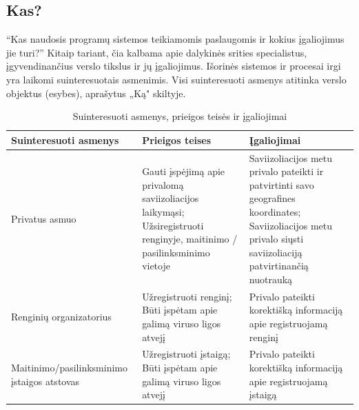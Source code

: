 \documentclass{VUMIFPSkursinis}
\begin{document}
\subsection{Kas?}
“Kas naudosis programų sistemos
teikiamomis paslaugomis ir kokius įgaliojimus jie turi?” Kitaip tariant, čia kalbama apie
dalykinės srities specialistus, įgyvendinančius verslo tikslus ir jų įgaliojimus. Išorinės sistemos ir procesai irgi yra laikomi suinteresuotais asmenimis. Visi suinteresuoti asmenys atitinka verslo objektus (esybes), aprašytus „Ką" skiltyje.
\begin{center}
	\small
	\begin{longtable}{|L{3cm}|C{5cm}|C{7cm}|}
		\caption{Suinteresuoti asmenys, prieigos teisės ir įgaliojimai}
		\label{table:EmployeeSalary}
		\\ \hline
		Suinteresuoti asmenys                                                                                                   &
		Prieigos teises                                                                                                         &
		Įgaliojimai                                                                                                                                                    \\ \hline
		Privatus asmuo                                                                                                          &
		Gauti įspėjimą apie privalomą saviizoliacijos laikymąsi; Užsiregistruoti renginyje, maitinimo / pasilinksminimo vietoje &
		Saviizoliacijos metu privalo pateikti ir patvirtinti savo geografines koordinates; Saviizoliacijos metu privalo siųsti saviizoliaciją patvirtinančią nuotrauką \\ \hline
		Renginių organizatorius                                                                                                 &
		Užregistruoti renginį; Būti įspėtam apie galimą viruso ligos atvejį                                                     &
		Privalo pateikti korektišką informaciją apie registruojamą renginį                                                                                             \\ \hline
		Maitinimo/pasilinksminimo įstaigos atstovas                                                                             &
		Užregistruoti įstaigą; Būti įspėtam apie galimą viruso ligos atvejį                                                     &
		Privalo pateikti korektišką informaciją apie registruojamą įstaigą                                                                                             \\ \hline

\end{longtable}
\end{center}
\end{document}
